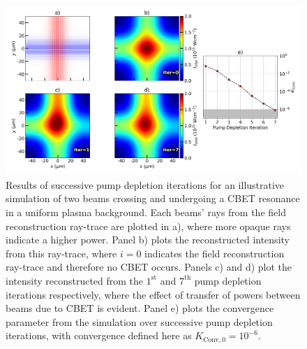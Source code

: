 \begin{figure}[t!]
    \includegraphics[width=1.0\linewidth]{Numerics/Images/PumpDepletionIterations.png}
    \centering
    \caption{Results of successive pump depletion iterations for an illustrative simulation of two beams crossing and undergoing a \ac{CBET} resonance in a uniform plasma background.
    Each beams' rays from the field reconstruction ray-trace are plotted in a), where more opaque rays indicate a higher power.
    Panel b) plots the reconstructed intensity from this ray-trace, where $i=0$ indicates the field reconstruction ray-trace and therefore no \ac{CBET} occurs.
    Panels c) and d) plot the intensity reconstructed from the $1^{\text{st}}$ and $7^{\text{th}}$ pump depletion iterations respectively, where the effect of transfer of powers between beams due to \ac{CBET} is evident.
    Panel e) plots the convergence parameter from the simulation over successive pump depletion iterations, with convergence defined here as $K_{\text{Conv},0}=10^{-6}$.}%
    \label{fig:PumpDepIters}
\end{figure}

